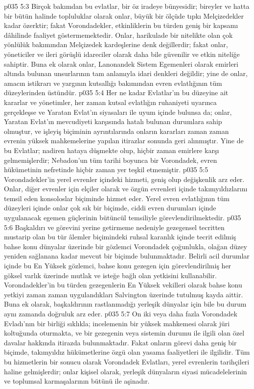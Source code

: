 \vs p035 5:3 Birçok bakımdan bu evlatlar, bir öz iradeye bünyesidir; bireyler ve hatta bir bütün halinde topluluklar olarak onlar, büyük bir ölçüde tıpkı Melçizedekler kadar özerktir; fakat Vorondadekler, etkinliklerin bu türden geniş bir kapsamı dâhilinde faaliyet göstermemektedir. Onlar, harikulade bir nitelikte olan çok yönlülük bakımından Melçizedek kardeşlerine denk değillerdir; fakat onlar, yöneticiler ve ileri görüşlü idareciler olarak daha bile güvenilir ve etkin niteliğe sahiptir. Buna ek olarak onlar, Lanonandek Sistem Egemenleri olarak emirleri altında bulunan unsurlarının tam anlamıyla idari denkleri değildir; yine de onlar, amacın istikrarı ve yargının kutsallığı bakımından evren evlatlığının tüm düzeylerinden üstündür.
\vs p035 5:4 Her ne kadar Evlatlar’ın bu düzeyine ait kararlar ve yönetimler, her zaman kutsal evlatlığın ruhaniyeti uyarınca gerçekleşse ve Yaratan Evlat’ın siyasaları ile uyum içinde bulunsa da; onlar, Yaratan Evlat’ın mevcudiyeti karşısında hatalı bulunan durumlara sahip olmuştur, ve işleyiş biçiminin ayrıntılarında onların kararları zaman zaman evrenin yüksek mahkemelerine yapılan itirazlar sonunda geri alınmıştır. Yine de bu Evlatlar; nadiren hataya düşmekte olup, hiçbir zaman emirlere karşı gelmemişlerdir; Nebadon’un tüm tarihi boyunca bir Vorondadek, evren hükümetinin nefretinde hiçbir zaman yer teşkil etmemiştir.
\vs p035 5:5 Vorondadekler’in yerel evrenler içindeki hizmeti, geniş olup değişkenlik arz eder. Onlar, diğer evrenler için elçiler olarak ve özgün evrenleri içinde takımyıldızlarını temsil eden konsoloslar biçiminde hizmet eder. Yerel evren evlatlığının tüm düzeyleri içinde onlar çok sık bir biçimde, ciddi evren durumları içinde uygulanacak egemen güçlerinin bütüncül temsiliyle görevlendirilmektedir.
\vs p035 5:6 Başkaldırı ve görevini yerine getirmeme nedeniyle gezegensel tecritten mustarip olan bu tür âlemler biçimindeki ruhsal karanlık içinde tecrit edilmiş bahse konu dünyalar üzerinde bir gözlemci Vorondadek çoğunlukla, olağan düzey yeniden sağlanana kadar mevcut bir biçimde bulunmaktadır. Belirli acil durumlar içinde bu En Yüksek gözlemci, bahse konu gezegen için görevlendirilmiş her göksel varlık üzerinde mutlak ve isteğe bağlı olan yetkisini kullanabilir. Vorondadekler’in bu türden gezegenlerin En Yüksek vekilleri olarak bahse konu yetkiyi zaman zaman uygulandıkları Salvington üzerinde tutulmuş kayda aittir. Buna ek olarak, başkaldırının rastlanmadığı yerleşik dünyalar için bile bu durum aynı zamanda doğruluk arz eder.
\vs p035 5:7 On iki veya daha fazla Vorondadek Evladı’nın bir birliği sıklıkla; incelemenin bir yüksek mahkemesi olarak jüri koltuğunda oturmakta, ve bir gezegenin veya sistemin durumu ile ilgili olan özel davalar hakkında itirazda bulunmaktadır. Fakat onların görevi daha geniş bir biçimde, takımyıldız hükümetlerine özgü olan yasama faaliyetleri ile ilgilidir. Tüm bu hizmetlerin bir sonucu olarak Vorondadek Evlatları, yerel evrenlerin tarihçileri haline gelmişlerdir; onlar kişisel olarak, yerleşik dünyaların siyasi mücadelelerinin ve toplumsal karmaşalarının bütünü ile aşinadır.
